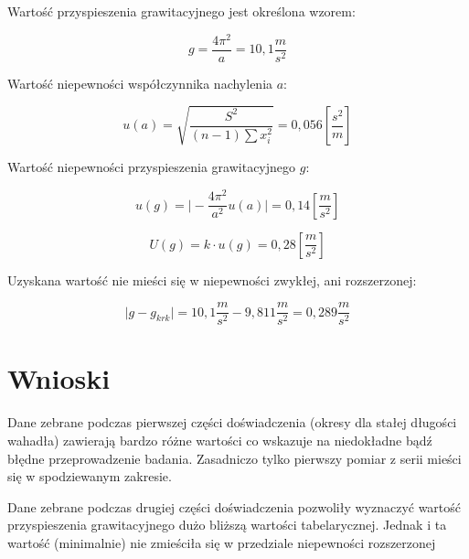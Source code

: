\documentclass[a4paper,10pt,twoside]{article}
\begin{document}
Wartość przyspieszenia grawitacyjnego jest określona wzorem:

$$ g = \frac{4 \pi^2}{a} = 10,1 \unit{\frac{m}{s^2}}$$

Wartość niepewności współczynnika nachylenia $a$:

$$ u(a) = \sqrt{ \frac{S^2}{(n - 1)\sum x_i^2} } = 0,056 \unit{[\frac{s^2}{m}]}$$

Wartość niepewności przyspieszenia grawitacyjnego $g$:

$$ u(g) = \vert - \frac{4 \pi^2}{a^2} u(a) \vert = 0,14 \unit{[\frac{m}{s^2}]}$$

$$ U(g) = k \cdot u(g) = 0,28 \unit{[\frac{m}{s^2}]}$$

Uzyskana wartość nie mieści się w niepewności zwykłej, ani rozszerzonej:

$$ \vert g - g_{krk} \vert = 10,1 \unit{\frac{m}{s^2}} - 9,811 \unit{\frac{m}{s^2}} = 0,289 \unit{\frac{m}{s^2}}$$

\section{Wnioski}

Dane zebrane podczas pierwszej części doświadczenia (okresy dla stałej długości wahadła) zawierają bardzo różne wartości co wskazuje na niedokładne bądź błędne przeprowadzenie badania. Zasadniczo tylko pierwszy pomiar z serii mieści się w spodziewanym zakresie.

Dane zebrane podczas drugiej części doświadczenia pozwoliły wyznaczyć wartość przyspieszenia grawitacyjnego dużo bliższą wartości tabelarycznej. Jednak i ta wartość (minimalnie) nie zmieściła się w przedziale niepewności rozszerzonej
\end{document}
